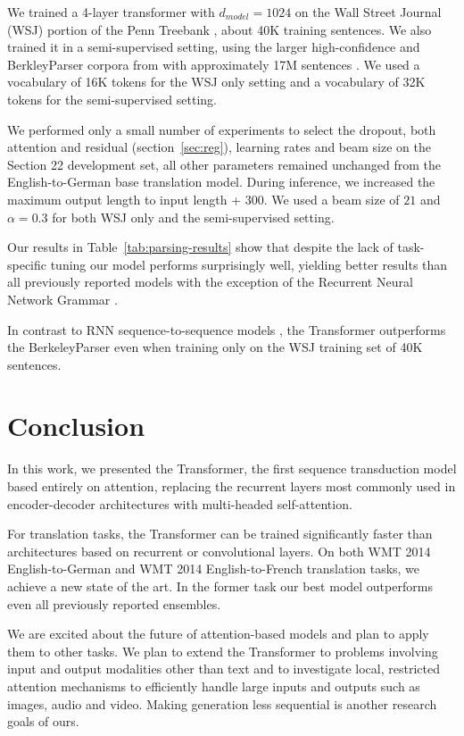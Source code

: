 \documentclass{article}
\begin{document}
We trained a 4-layer transformer with $d_{model} = 1024$ on the Wall Street Journal (WSJ) portion of the Penn Treebank \citep{marcus1993building}, about 40K training sentences. We also trained it in a semi-supervised setting, using the larger high-confidence and BerkleyParser corpora from with approximately 17M sentences \citep{KVparse15}. We used a vocabulary of 16K tokens for the WSJ only setting and a vocabulary of 32K tokens for the semi-supervised setting.

We performed only a small number of experiments to select the dropout, both attention and residual (section~\ref{sec:reg}), learning rates and beam size on the Section 22 development set, all other parameters remained unchanged from the English-to-German base translation model. During inference, we increased the maximum output length to input length + $300$. We used a beam size of $21$ and $\alpha=0.3$ for both WSJ only and the semi-supervised setting.

Our results in Table~\ref{tab:parsing-results} show that despite the lack of task-specific tuning our model performs surprisingly well, yielding better results than all previously reported models with the exception of the Recurrent Neural Network Grammar \cite{dyer-rnng:16}.

In contrast to RNN sequence-to-sequence models \citep{KVparse15}, the Transformer outperforms the BerkeleyParser \cite{petrov-EtAl:2006:ACL} even when training only on the WSJ training set of 40K sentences.

\section{Conclusion}
In this work, we presented the Transformer, the first sequence transduction model based entirely on attention, replacing the recurrent layers most commonly used in encoder-decoder architectures with multi-headed self-attention.

For translation tasks, the Transformer can be trained significantly faster than architectures based on recurrent or convolutional layers. On both WMT 2014 English-to-German and WMT 2014 English-to-French translation tasks, we achieve a new state of the art. In the former task our best model outperforms even all previously reported ensembles. 

We are excited about the future of attention-based models and plan to apply them to other tasks. We plan to extend the Transformer to problems involving input and output modalities other than text and to investigate local, restricted attention mechanisms to efficiently handle large inputs and outputs such as images, audio and video.
Making generation less sequential is another research goals of ours.
\end{document}
